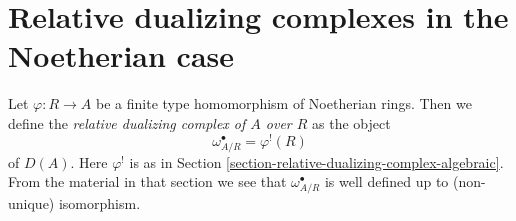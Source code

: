 \section{Relative dualizing complexes in the Noetherian case}
\label{section-relative-dualizing-complexes-Noetherian}

\noindent
Let $\varphi : R \to A$ be a finite type homomorphism of
Noetherian rings. Then we define the {\it relative dualizing
complex of $A$ over $R$} as the object
$$
\omega_{A/R}^\bullet = \varphi^!(R)
$$
of $D(A)$. Here $\varphi^!$ is as in
Section \ref{section-relative-dualizing-complex-algebraic}.
From the material in that section we see that
$\omega_{A/R}^\bullet$ is well defined up to (non-unique) isomorphism.

